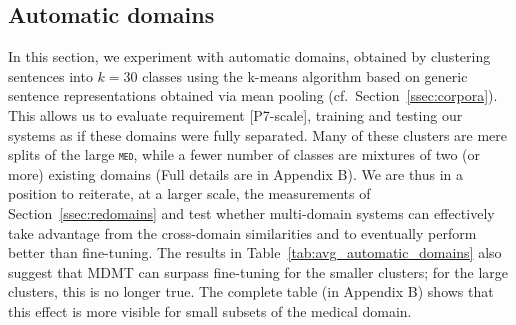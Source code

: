 \documentclass[11pt,a4paper]{article}
\newcommand{\revision}[1]{#1}
\newcommand{\domain}[1]{\texttt{\textsc{#1}}}
\begin{document}
\subsection{Automatic domains \label{ssec:autodomains}}
In this section, we experiment with automatic domains, obtained by clustering sentences into $k=30$ classes using the k-means algorithm based on generic sentence representations obtained via mean pooling (cf.\ Section~\ref{ssec:corpora}). This allows us to evaluate requirement [P7-scale], training and testing our systems as if these domains were fully separated. Many of these clusters are mere splits of the large \domain{med}, while a fewer number of classes are mixtures of two (or more) existing domains \revision{(Full details are in Appendix B)}. We are thus in a position to reiterate, at a larger scale, the measurements of Section~\ref{ssec:redomains} and test whether multi-domain systems can effectively take advantage from the cross-domain similarities and to eventually perform better than fine-tuning. \revision{The results in Table~\ref{tab:avg_automatic_domains} also suggest that MDMT can surpass fine-tuning for the smaller clusters; for the large clusters, this is no longer true. The complete table (in Appendix B) shows that this effect is more visible for small subsets of the medical domain.}
\end{document}
